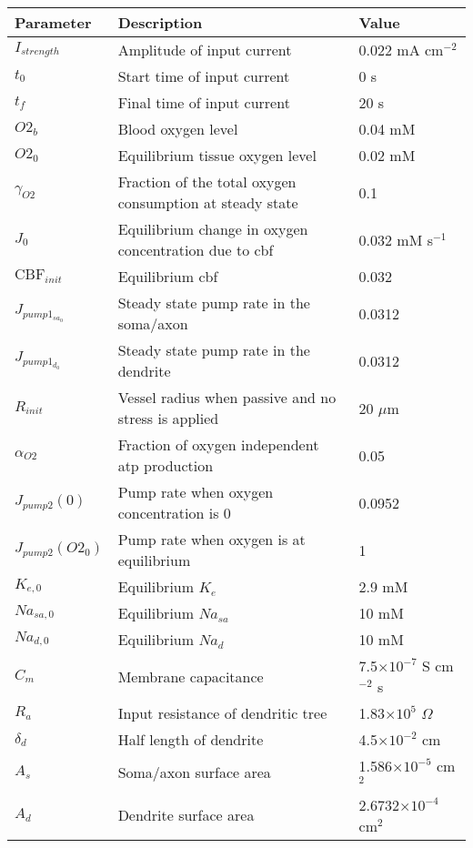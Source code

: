 \documentclass[11pt]{elsarticle}
\newcommand{\um}{$\mu$m\xspace}
\newcommand{\mAcm}{mA cm$^{-2}$\xspace}
\newcommand{\psec}{s$^{-1}$\xspace}
\begin{document}
\begin{longtable}[h!]{ p{0.12\linewidth}   p{0.6\linewidth}   p{0.28\linewidth} }
	\hline
	Parameter & Description & Value \\
	\hline
$I_{strength}$ 		& Amplitude of input current 		& 0.022 \mAcm 		  \\
$t_0$				& Start time of input current			& 0 s	  \\
$t_f$		& Final time of input current 			& 20 s		  \\
$O2_b$ 		& Blood oxygen level							& 0.04 mM		\\
$O2_0$ 		& Equilibrium tissue oxygen level				& 0.02 mM 		\\
$\gamma_{O2}$ 		& Fraction of the total oxygen consumption at steady state		& 0.1 		 \\
$J_0$		& Equilibrium change in oxygen concentration due to \gls{cbf}						& 0.032 mM \psec		\\
$\text{CBF}_{init}$		& Equilibrium \gls{cbf}						& 0.032 		\\
$J_{pump1_{sa_0}}$ 		& Steady state pump rate in the soma/axon			& 0.0312 		 \\
$J_{pump1_{d_0}}$ 		& Steady state pump rate in the dendrite		& 0.0312 		 \\
$R_{init}$ 		& Vessel radius when passive and no stress is applied				& 20 \um 		 \\
$\alpha_{O2}$ 		& Fraction of oxygen independent \gls{atp} production		& 0.05 		 \\
$J_{pump2}(0)$ 		& Pump rate when oxygen concentration is 0		& 0.0952 		\\
$J_{pump2}(O2_0)$ 		& Pump rate when oxygen is at equilibrium			& 1 	 \\
$K_{e,0}$ 		& Equilibrium $K_e$		& 2.9 mM	 \\
$Na_{sa,0}$ 		& Equilibrium $Na_{sa}$											& 10 mM		\\
$Na_{d,0}$ 		& Equilibrium $Na_d$										& 10 mM	 \\
$C_m$ 		& Membrane capacitance 		& 7.5$\times 10^{-7}$ S cm$^{-2}$ s 	 \\
$R_a$		& Input resistance of dendritic tree & 1.83$\times 10^5$ $\Omega$ \\ 
$\delta_d$	& Half length of dendrite	& 4.5$\times 10^{-2}$ cm \\
$A_s$ 		& Soma/axon surface area		& 1.586$\times 10^{-5}$ cm$^2$ 	 \\
$A_d$ 		& Dendrite surface area	& 2.6732$\times 10^{-4}$ cm$^2$  \\

\end{longtable}
\end{document}

